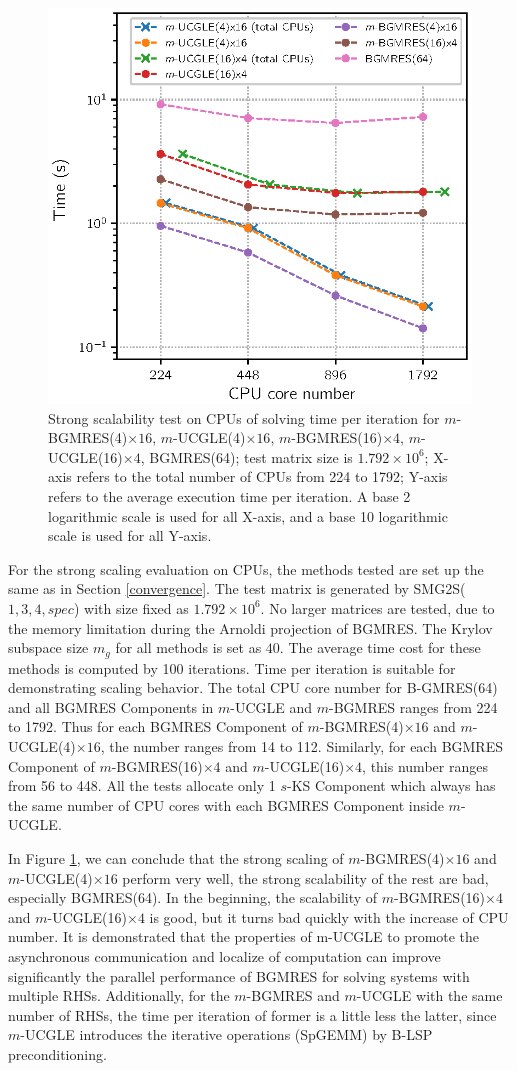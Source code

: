 \begin{figure}[htbp]
	\centering
	\includegraphics[width=.62\linewidth]{fig/scalable_mucgle.eps}
	\caption{Strong scalability test on CPUs of solving time per iteration for $m$-BGMRES(4)$\times 16$, $m$-UCGLE(4)$\times 16$, $m$-BGMRES(16)$\times 4$, $m$-UCGLE(16)$\times 4$, BGMRES(64); test matrix size is $1.792 \times 10^6$; X-axis refers to the total number of CPUs from 224 to 1792; Y-axis refers to the average execution time per iteration. A base 2 logarithmic scale is used for all X-axis, and a base 10 logarithmic scale is used for all Y-axis.}
	\label{fig_1_case}
\end{figure}

For the strong scaling evaluation on CPUs, the methods tested are set up the same as in Section \ref{convergence}. The test matrix is generated by SMG2S($1,3,4,spec$) with size fixed as $1.792 \times 10^6$. No larger matrices are tested, due to the memory limitation during the Arnoldi projection of BGMRES. The Krylov subspace size $m_g$ for all methods is set as $40$. The average time cost for these methods is computed by 100 iterations. Time per iteration is suitable for demonstrating scaling behavior. The total CPU core number for B-GMRES(64) and all BGMRES Components in $m$-UCGLE and $m$-BGMRES ranges from 224 to 1792. Thus for each BGMRES Component of $m$-BGMRES(4)$\times 16$ and $m$-UCGLE(4)$\times 16$, the number ranges from 14 to 112. Similarly, for each BGMRES Component of $m$-BGMRES(16)$\times 4$ and $m$-UCGLE(16)$\times 4$, this number ranges from 56 to 448. All the tests allocate only 1 $s$-KS Component which always has the same number of CPU cores with each BGMRES Component inside $m$-UCGLE.

In Figure \ref{fig_1_case}, we can conclude that the strong scaling of $m$-BGMRES(4)$\times 16$ and $m$-UCGLE(4)$\times 16$ perform very well, the strong scalability of the rest are bad, especially BGMRES(64). In the beginning, the scalability of $m$-BGMRES(16)$\times 4$ and $m$-UCGLE(16)$\times 4$ is good, but it turns bad quickly with the increase of CPU number. It is demonstrated that the properties of m-UCGLE to promote the asynchronous communication and localize of computation can improve significantly the parallel performance of BGMRES for solving systems with multiple RHSs. Additionally,  for the $m$-BGMRES and $m$-UCGLE with the same number of RHSs, the time per iteration of former is a little less the latter, since $m$-UCGLE introduces the iterative operations (SpGEMM) by B-LSP preconditioning.

